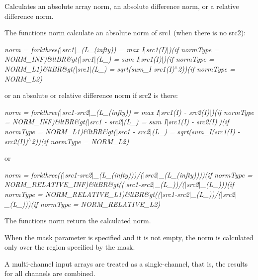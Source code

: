 Calculates an absolute array norm, an absolute difference norm, or a relative difference norm.

The functions {\ttfamily norm} calculate an absolute norm of {\ttfamily src1} (when there is no {\ttfamily src2})\+:

{\itshape norm = forkthree($\vert$src1$\vert$\+\_\+(L\+\_\+(infty)) = max {\itshape I$\vert$src1(I)$\vert$)(if norm\+Type = N\+O\+R\+M\+\_\+\+I\+NF)\&lt\+BR\&gt($\vert$src1$\vert$}(L\+\_) = sum {\itshape I$\vert$src1(I)$\vert$)(if norm\+Type = N\+O\+R\+M\+\_\+\+L1)\&lt\+BR\&gt($\vert$src1$\vert$}(L\+\_) = sqrt(sum\+\_\+\+I src1(\+I)$^\wedge$2))(if norm\+Type = N\+O\+R\+M\+\_\+\+L2)}

or an absolute or relative difference norm if {\ttfamily src2} is there\+:

{\itshape norm = forkthree($\vert$src1-\/src2$\vert$\+\_\+(L\+\_\+(infty)) = max {\itshape I$\vert$src1(I) -\/ src2(\+I)$\vert$)(if norm\+Type = N\+O\+R\+M\+\_\+\+I\+NF)\&lt\+BR\&gt($\vert$src1 -\/ src2$\vert$}(L\+\_) = sum {\itshape I$\vert$src1(I) -\/ src2(\+I)$\vert$)(if norm\+Type = N\+O\+R\+M\+\_\+\+L1)\&lt\+BR\&gt($\vert$src1 -\/ src2$\vert$}(L\+\_) = sqrt(sum\+\_\+I(src1(\+I) -\/ src2(\+I))$^\wedge$2))(if norm\+Type = N\+O\+R\+M\+\_\+\+L2)}

or

{\itshape norm = forkthree(($\vert$src1-\/src2$\vert$\+\_\+(L\+\_\+(infty)))/($\vert$src2$\vert$\+\_\+(L\+\_\+(infty))))(if norm\+Type = N\+O\+R\+M\+\_\+\+R\+E\+L\+A\+T\+I\+V\+E\+\_\+\+I\+NF)\&lt\+BR\&gt(($\vert$src1-\/src2$\vert$\+\_\+(L\+\_))/($\vert$src2$\vert$\+\_\+(L\+\_)))(if norm\+Type = N\+O\+R\+M\+\_\+\+R\+E\+L\+A\+T\+I\+V\+E\+\_\+\+L1)\&lt\+BR\&gt(($\vert$src1-\/src2$\vert$\+\_\+(L\+\_))/($\vert$src2$\vert$\+\_\+(L\+\_)))(if norm\+Type = N\+O\+R\+M\+\_\+\+R\+E\+L\+A\+T\+I\+V\+E\+\_\+\+L2)}

The functions {\ttfamily norm} return the calculated norm.

When the {\ttfamily mask} parameter is specified and it is not empty, the norm is calculated only over the region specified by the mask.

A multi-\/channel input arrays are treated as a single-\/channel, that is, the results for all channels are combined.


